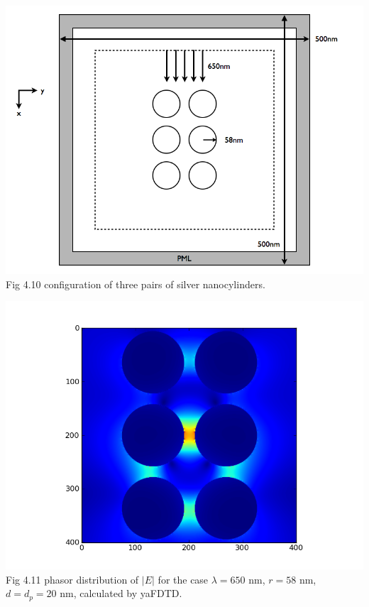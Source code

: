 \documentclass[openany]{book}
\begin{document}
\begin{center}
\includegraphics[scale=0.5]{images/open-cavity-config-r58.png}\\
Fig 4.10
configuration of three pairs of silver nanocylinders.
\end{center}

\begin{center}
\includegraphics[scale=0.8]{images/etotal-r58.png}\\
Fig 4.11
phasor distribution of $|E|$ for the case $\lambda = 650$ nm, $r = 58$ nm, $d = d_p = 20$ nm, calculated by yaFDTD.
\end{center}
\end{document}
